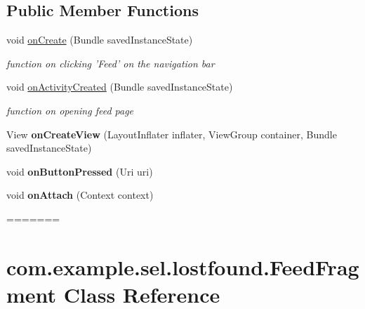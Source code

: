 \subsection*{Public Member Functions}
\begin{DoxyCompactItemize}
\item 
\hypertarget{classcom_1_1example_1_1sel_1_1lostfound_1_1FeedFragment_a027942ee12844b17c604195b91f9948d}{void \hyperlink{classcom_1_1example_1_1sel_1_1lostfound_1_1FeedFragment_a027942ee12844b17c604195b91f9948d}{on\-Create} (Bundle saved\-Instance\-State)}\label{classcom_1_1example_1_1sel_1_1lostfound_1_1FeedFragment_a027942ee12844b17c604195b91f9948d}

\begin{DoxyCompactList}\small\item\em function on clicking 'Feed' on the navigation bar \end{DoxyCompactList}\item 
void \hyperlink{classcom_1_1example_1_1sel_1_1lostfound_1_1FeedFragment_abb8194bc01339ece4f650c3b7e716a5f}{on\-Activity\-Created} (Bundle saved\-Instance\-State)
\begin{DoxyCompactList}\small\item\em function on opening feed page \end{DoxyCompactList}\item 
\hypertarget{classcom_1_1example_1_1sel_1_1lostfound_1_1FeedFragment_a4e2cc79785d7392af2839c0b3900b12b}{View {\bfseries on\-Create\-View} (Layout\-Inflater inflater, View\-Group container, Bundle saved\-Instance\-State)}\label{classcom_1_1example_1_1sel_1_1lostfound_1_1FeedFragment_a4e2cc79785d7392af2839c0b3900b12b}

\item 
\hypertarget{classcom_1_1example_1_1sel_1_1lostfound_1_1FeedFragment_a4a39372816f2c53d6ff1b3d12be98c23}{void {\bfseries on\-Button\-Pressed} (Uri uri)}\label{classcom_1_1example_1_1sel_1_1lostfound_1_1FeedFragment_a4a39372816f2c53d6ff1b3d12be98c23}

\item 
\hypertarget{classcom_1_1example_1_1sel_1_1lostfound_1_1FeedFragment_a63947b4cbebd081d42113ff157a2f6b0}{void {\bfseries on\-Attach} (Context context)}\label{classcom_1_1example_1_1sel_1_1lostfound_1_1FeedFragment_a63947b4cbebd081d42113ff157a2f6b0}
=======
\hypertarget{classcom_1_1example_1_1sel_1_1lostfound_1_1FeedFragment}{\section{com.\-example.\-sel.\-lostfound.\-Feed\-Fragment \-Class \-Reference}
\label{classcom_1_1example_1_1sel_1_1lostfound_1_1FeedFragment}
}



\end{DoxyCompactItemize}

